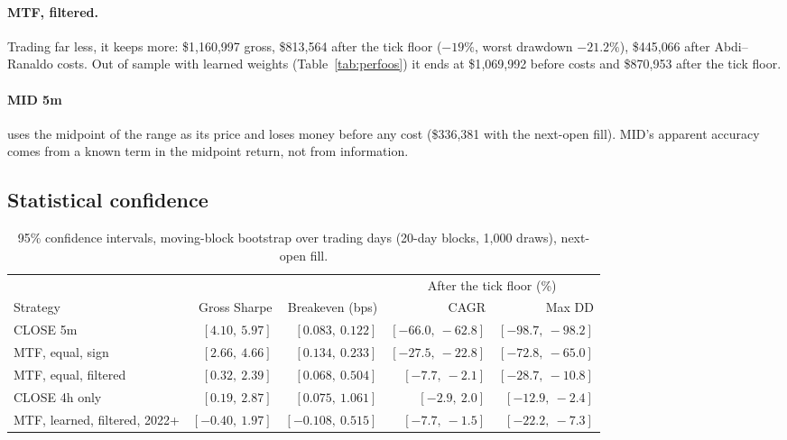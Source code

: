 \documentclass[11pt,a4paper]{article}
\begin{document}
\paragraph{MTF, filtered.} Trading far less, it keeps more: \$1{,}160{,}997 gross, \$813{,}564 after the tick
floor ($-19\%$, worst drawdown $-21.2\%$), \$445{,}066 after Abdi--Ranaldo costs. Out of sample
with learned weights (Table~\ref{tab:perfoos}) it ends at \$1{,}069{,}992 before costs and \$870{,}953
after the tick floor.

\paragraph{MID 5m} uses the midpoint of the range as its price and loses money before any cost
(\$336{,}381 with the next-open fill). MID's apparent accuracy comes from a known term in the midpoint
return, not from information.

\subsection{Statistical confidence}

\begin{table}[htbp]
\centering
\caption{95\% confidence intervals, moving-block bootstrap over trading days \citep{kunsch1989}
(20-day blocks, 1{,}000 draws), next-open fill.}
\label{tab:ci}
\footnotesize
\setlength{\tabcolsep}{3pt}
\begin{tabular}{@{}lrrrr@{}}
\toprule
& & & \multicolumn{2}{c}{After the tick floor (\%)} \\
\cmidrule(lr){4-5}
Strategy & Gross Sharpe & Breakeven (bps) & CAGR & Max DD \\
\midrule
CLOSE 5m & $[4.10,\ 5.97]$ & $[0.083,\ 0.122]$ & $[-66.0,\ -62.8]$ & $[-98.7,\ -98.2]$ \\
MTF, equal, sign & $[2.66,\ 4.66]$ & $[0.134,\ 0.233]$ & $[-27.5,\ -22.8]$ & $[-72.8,\ -65.0]$ \\
MTF, equal, filtered & $[0.32,\ 2.39]$ & $[0.068,\ 0.504]$ & $[-7.7,\ -2.1]$ & $[-28.7,\ -10.8]$ \\
CLOSE 4h only & $[0.19,\ 2.87]$ & $[0.075,\ 1.061]$ & $[-2.9,\ 2.0]$ & $[-12.9,\ -2.4]$ \\
MTF, learned, filtered, 2022+ & $[-0.40,\ 1.97]$ & $[-0.108,\ 0.515]$ & $[-7.7,\ -1.5]$ & $[-22.2,\ -7.3]$ \\
\bottomrule
\end{tabular}
\end{table}
\end{document}
